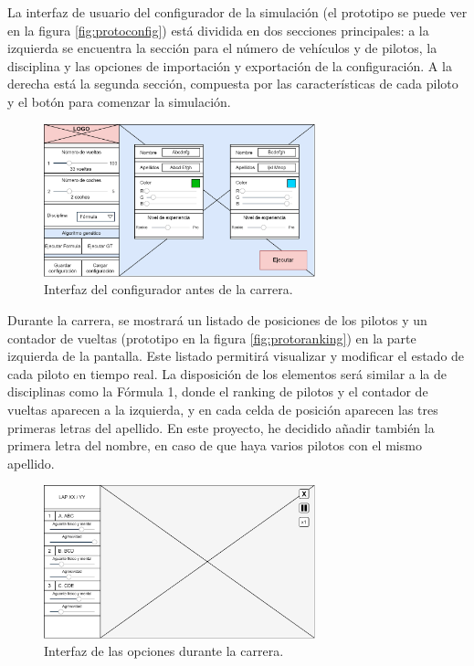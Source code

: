 La interfaz de usuario del configurador de la simulación (el prototipo se puede ver en la figura \ref{fig:protoconfig}) está dividida en dos secciones principales: a la izquierda se encuentra la sección para el número de vehículos y de pilotos, la disciplina y las opciones de importación y exportación de la configuración. A la derecha está la segunda sección, compuesta por las características de cada piloto y el botón para comenzar la simulación.

\begin{figure}[H]
    \centering
    \includegraphics[width=0.7\textwidth]{imagenes/pag1.png}
    \caption{Interfaz del configurador antes de la carrera.}
\end{figure}

Durante la carrera, se mostrará un listado de posiciones de los pilotos y un contador de vueltas (prototipo en la figura \ref{fig:protoranking}) en la parte izquierda de la pantalla. Este listado permitirá visualizar y modificar el estado de cada piloto en tiempo real. La disposición de los elementos será similar a la de disciplinas como la Fórmula 1, donde el ranking de pilotos y el contador de vueltas aparecen a la izquierda, y en cada celda de posición aparecen las tres primeras letras del apellido. En este proyecto, he decidido añadir también la primera letra del nombre, en caso de que haya varios pilotos con el mismo apellido.


\begin{figure}[H]
    \centering
    \includegraphics[width=0.7\textwidth]{imagenes/pag2.png}
    \caption{Interfaz de las opciones durante la carrera.}
\end{figure}

